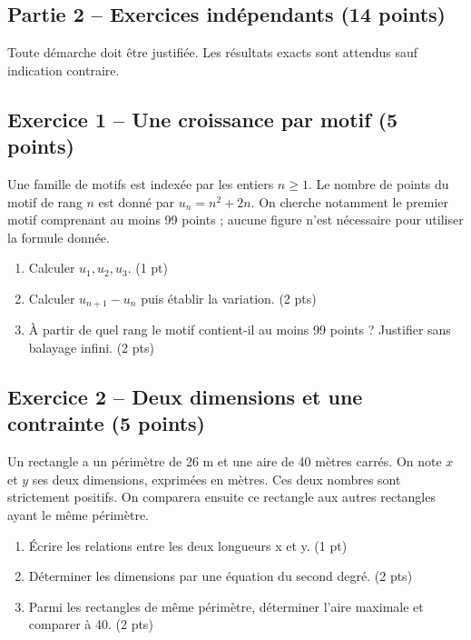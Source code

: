 \clearpage\subsection*{Partie 2 -- Exercices indépendants (14 points)}
Toute démarche doit être justifiée. Les résultats exacts sont attendus sauf indication contraire.
\subsection*{Exercice 1 -- Une croissance par motif (5 points)}
Une famille de motifs est indexée par les entiers $n\geq1$. Le nombre de points du motif de rang $n$ est donné par $u_n=n^2+2n$. On cherche notamment le premier motif comprenant au moins 99 points ; aucune figure n’est nécessaire pour utiliser la formule donnée.
\begin{enumerate}
\item Calculer $u_1,u_2,u_3$. \hfill(1 pt)
\item Calculer $u_{n+1}-u_n$ puis établir la variation. \hfill(2 pts)
\item À partir de quel rang le motif contient-il au moins 99 points ? Justifier sans balayage infini. \hfill(2 pts)
\end{enumerate}
\subsection*{Exercice 2 -- Deux dimensions et une contrainte (5 points)}
Un rectangle a un périmètre de 26 m et une aire de 40 mètres carrés. On note $x$ et $y$ ses deux dimensions, exprimées en mètres. Ces deux nombres sont strictement positifs. On comparera ensuite ce rectangle aux autres rectangles ayant le même périmètre.
\begin{enumerate}
\item Écrire les relations entre les deux longueurs x et y. \hfill(1 pt)
\item Déterminer les dimensions par une équation du second degré. \hfill(2 pts)
\item Parmi les rectangles de même périmètre, déterminer l’aire maximale et comparer à 40. \hfill(2 pts)
\end{enumerate}
